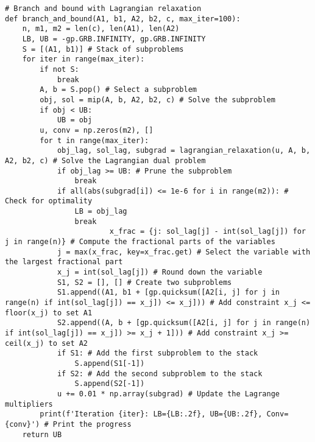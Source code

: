 \begin{verbatim}
# Branch and bound with Lagrangian relaxation
def branch_and_bound(A1, b1, A2, b2, c, max_iter=100):
    n, m1, m2 = len(c), len(A1), len(A2)
    LB, UB = -gp.GRB.INFINITY, gp.GRB.INFINITY
    S = [(A1, b1)] # Stack of subproblems
    for iter in range(max_iter):
        if not S:
            break
        A, b = S.pop() # Select a subproblem
        obj, sol = mip(A, b, A2, b2, c) # Solve the subproblem
        if obj < UB:
            UB = obj
        u, conv = np.zeros(m2), []
        for t in range(max_iter):
            obj_lag, sol_lag, subgrad = lagrangian_relaxation(u, A, b, A2, b2, c) # Solve the Lagrangian dual problem
            if obj_lag >= UB: # Prune the subproblem
                break
            if all(abs(subgrad[i]) <= 1e-6 for i in range(m2)): # Check for optimality
                LB = obj_lag
                break
                        x_frac = {j: sol_lag[j] - int(sol_lag[j]) for j in range(n)} # Compute the fractional parts of the variables
            j = max(x_frac, key=x_frac.get) # Select the variable with the largest fractional part
            x_j = int(sol_lag[j]) # Round down the variable
            S1, S2 = [], [] # Create two subproblems
            S1.append((A1, b1 + [gp.quicksum([A2[i, j] for j in range(n) if int(sol_lag[j]) == x_j]) <= x_j])) # Add constraint x_j <= floor(x_j) to set A1
            S2.append((A, b + [gp.quicksum([A2[i, j] for j in range(n) if int(sol_lag[j]) == x_j]) >= x_j + 1])) # Add constraint x_j >= ceil(x_j) to set A2
            if S1: # Add the first subproblem to the stack
                S.append(S1[-1])
            if S2: # Add the second subproblem to the stack
                S.append(S2[-1])
            u += 0.01 * np.array(subgrad) # Update the Lagrange multipliers
        print(f'Iteration {iter}: LB={LB:.2f}, UB={UB:.2f}, Conv={conv}') # Print the progress
    return UB
\end{verbatim}


